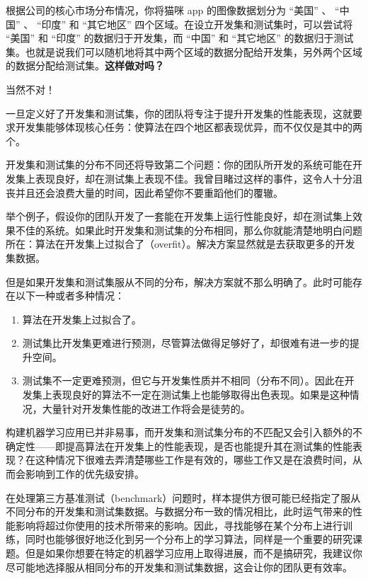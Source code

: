 根据公司的核心市场分布情况，你将猫咪 app 的图像数据划分为 ``美国'' 、
``中国'' 、 ``印度'' 和 ``其它地区''
四个区域。在设立开发集和测试集时，可以尝试将 ``美国'' 和 ``印度''
的数据归于开发集，而 ``中国'' 和 ``其它地区''
的数据归于测试集。也就是说我们可以随机地将其中两个区域的数据分配给开发集，另外两个区域的数据分配给测试集。\textbf{这样做对吗？}

当然不对！

一旦定义好了开发集和测试集，你的团队将专注于提升开发集的性能表现，这就要求开发集能够体现核心任务：使算法在四个地区都表现优异，而不仅仅是其中的两个。

开发集和测试集的分布不同还将导致第二个问题：你的团队所开发的系统可能在开发集上表现良好，却在测试集上表现不佳。我曾目睹过这样的事件，这令人十分沮丧并且还会浪费大量的时间，因此希望你不要重蹈他们的覆辙。

举个例子，假设你的团队开发了一套能在开发集上运行性能良好，却在测试集上效果不佳的系统。如果此时开发集和测试集的分布相同，那么你就能清楚地明白问题所在：算法在开发集上过拟合了（overfit）。解决方案显然就是去获取更多的开发集数据。

但是如果开发集和测试集服从不同的分布，解决方案就不那么明确了。此时可能存在以下一种或者多种情况：

\begin{enumerate}
\def\labelenumi{\arabic{enumi}.}
\tightlist
\item
  算法在开发集上过拟合了。
\item
  测试集比开发集更难进行预测，尽管算法做得足够好了，却很难有进一步的提升空间。
\item
  测试集不一定更难预测，但它与开发集性质并不相同（分布不同）。因此在开发集上表现良好的算法不一定在测试集上也能够取得出色表现。如果是这种情况，大量针对开发集性能的改进工作将会是徒劳的。
\end{enumerate}

构建机器学习应用已并非易事，而开发集和测试集分布的不匹配又会引入额外的不确定性------即提高算法在开发集上的性能表现，是否也能提升其在测试集的性能表现？在这种情况下很难去弄清楚哪些工作是有效的，哪些工作又是在浪费时间，从而会影响到工作的优先级安排。

在处理第三方基准测试（benchmark）问题时，样本提供方很可能已经指定了服从不同分布的开发集和测试集数据。与数据分布一致的情况相比，此时运气带来的性能影响将超过你使用的技术所带来的影响。因此，寻找能够在某个分布上进行训练，同时也能够很好地泛化到另一个分布上的学习算法，同样是一个重要的研究课题。但是如果你想要在特定的机器学习应用上取得进展，而不是搞研究，我建议你尽可能地选择服从相同分布的开发集和测试集数据，这会让你的团队更有效率。

